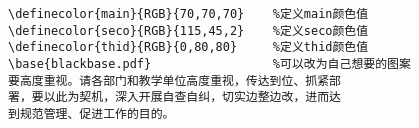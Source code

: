 \documentclass[12pt,a4paper]{ctexbook}
\begin{document}
\large{}
\begin{verbatim}
\definecolor{main}{RGB}{70,70,70}    %定义main颜色值
\definecolor{seco}{RGB}{115,45,2}    %定义seco颜色值
\definecolor{thid}{RGB}{0,80,80}     %定义thid颜色值
\base{blackbase.pdf}                 %可以改为自己想要的图案
要高度重视。请各部门和教学单位高度重视，传达到位、抓紧部
署，要以此为契机，深入开展自查自纠，切实边整边改，进而达
到规范管理、促进工作的目的。
\end{verbatim}
\end{document}
